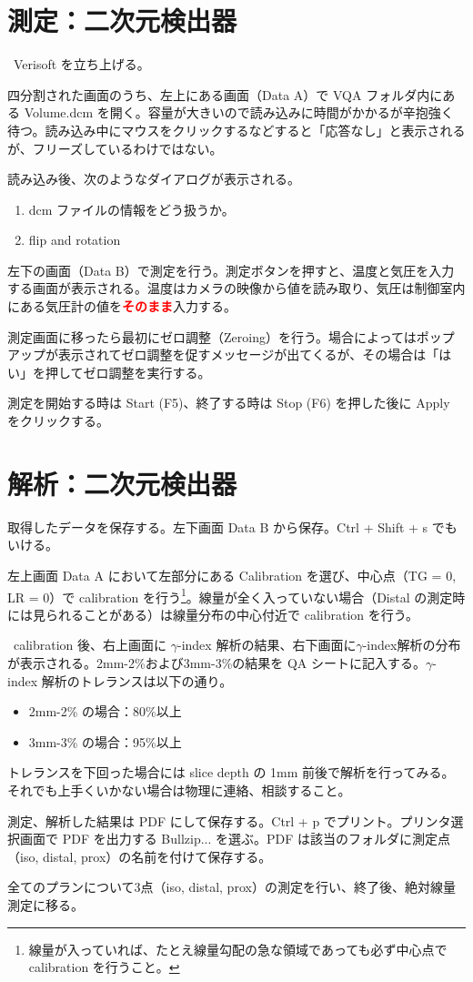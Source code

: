 \documentclass[11pt,a4paper]{jsarticle}
\newcommand{\noindot}{\noindent{$\cdot$}} %
\begin{document}
\section{測定：二次元検出器}
\noindot ~Verisoft を立ち上げる。\par
\noindot 四分割された画面のうち、左上にある画面（Data A）で VQA フォルダ内にある Volume.dcm を開く。容量が大きいので読み込みに時間がかかるが辛抱強く待つ。読み込み中にマウスをクリックするなどすると「応答なし」と表示されるが、フリーズしているわけではない。\par
\noindot 読み込み後、次のようなダイアログが表示される。
	\begin{enumerate}
		\item dcm ファイルの情報をどう扱うか。
		\item flip and rotation
	\end{enumerate}%
\noindot 左下の画面（Data B）で測定を行う。測定ボタンを押すと、温度と気圧を入力する画面が表示される。温度はカメラの映像から値を読み取り、気圧は制御室内にある気圧計の値を{\bf{\textcolor{red}{そのまま}}}入力する。\par
\noindot 測定画面に移ったら最初にゼロ調整（Zeroing）を行う。場合によってはポップアップが表示されてゼロ調整を促すメッセージが出てくるが、その場合は「はい」を押してゼロ調整を実行する。\par
\noindot 測定を開始する時は Start (F5)、終了する時は Stop (F6) を押した後に Apply をクリックする。\par

\section{解析：二次元検出器}
\noindot 取得したデータを保存する。左下画面 Data B から保存。Ctrl + Shift + s でもいける。\par
\noindot 左上画面 Data A において左部分にある Calibration を選び、中心点（TG = 0, LR = 0）で calibration を行う\footnote{線量が入っていれば、たとえ線量勾配の急な領域であっても必ず中心点で calibration を行うこと。}。線量が全く入っていない場合（Distal の測定時には見られることがある）は線量分布の中心付近で calibration を行う。\par
\noindot ~calibration 後、右上画面に $\gamma$-index 解析の結果、右下画面に$\gamma$-index解析の分布が表示される。2mm-2\%および3mm-3\%の結果を QA シートに記入する。$\gamma$-index 解析のトレランスは以下の通り。
	\begin{itemize}
		\item 2mm-2\% の場合：80\%以上
		\item 3mm-3\% の場合：95\%以上
	\end{itemize}%
トレランスを下回った場合には slice depth の 1mm 前後で解析を行ってみる。それでも上手くいかない場合は物理に連絡、相談すること。\par
\noindot 測定、解析した結果は PDF にして保存する。Ctrl + p でプリント。プリンタ選択画面で PDF を出力する Bullzip... を選ぶ。PDF は該当のフォルダに測定点（iso, distal, prox）の名前を付けて保存する。\par
\noindot 全てのプランについて3点（iso, distal, prox）の測定を行い、終了後、絶対線量測定に移る。
%
\end{document}
